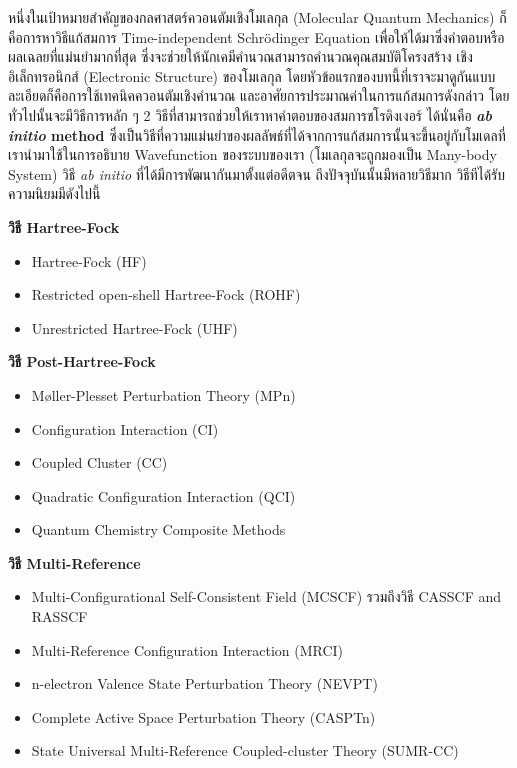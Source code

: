 หนึ่งในเป้าหมายสำคัญของกลศาสตร์ควอนตัมเชิงโมเลกุล (Molecular Quantum Mechanics) ก็คือการหาวิธีแก้สมการ Time-independent
Schr\"{o}dinger Equation เพื่อให้ได้มาซึ่งคำตอบหรือผลเฉลยที่แม่นยำมากที่สุด ซึ่งจะช่วยให้นักเคมีคำนวณสามารถคำนวณคุณสมบัติโครงสร้าง%
เชิงอิเล็กทรอนิกส์ (Electronic Structure) ของโมเลกุล โดยหัวข้อแรกของบทนี้ที่เราจะมาดูกันแบบละเอียดก็คือการใช้เทคนิคควอนตัมเชิงคำนวณ%
และอาศัยการประมาณค่าในการแก้สมการดังกล่าว โดยทั่วไปนั้นจะมีวิธีการหลัก ๆ 2 วิธีที่สามารถช่วยให้เราหาคำตอบของสมการชโรดิงเงอร์ ได้นั่นคือ
\textbf{\textit{ab initio} method} ซึ่งเป็นวิธีที่ความแม่นยำของผลลัพธ์ที่ได้จากการแก้สมการนั้นจะขึ้นอยู่กับโมเดลที่เรานำมาใช้ในการอธิบาย
Wavefunction ของระบบของเรา (โมเลกุลจะถูกมองเป็น Many-body System) วิธี \textit{ab initio} ที่ได้มีการพัฒนากันมาตั้งแต่อดีตจน%
ถึงปัจจุบันนั้นมีหลายวิธีมาก\autocite{friesner2005,helgaker2014,jensen2017} วิธีทีได้รับความนิยมมีดังไปนี้

\noindent \textbf{วิธี Hartree-Fock}
\begin{itemize}[topsep=0pt,noitemsep]
    \item Hartree-Fock (HF)
    \item Restricted open-shell Hartree-Fock (ROHF)
    \item Unrestricted Hartree-Fock (UHF)
\end{itemize}

\noindent \textbf{วิธี Post-Hartree-Fock}
\begin{itemize}[topsep=0pt,noitemsep]
    \item Møller-Plesset Perturbation Theory (MPn)
    \item Configuration Interaction (CI)
    \item Coupled Cluster (CC)
    \item Quadratic Configuration Interaction (QCI)
    \item Quantum Chemistry Composite Methods
\end{itemize}

\noindent \textbf{วิธี Multi-Reference}
\begin{itemize}[topsep=0pt,noitemsep]
    \item Multi-Configurational Self-Consistent Field (MCSCF) รวมถึงวิธี CASSCF and RASSCF
    \item Multi-Reference Configuration Interaction (MRCI)
    \item n-electron Valence State Perturbation Theory (NEVPT)
    \item Complete Active Space Perturbation Theory (CASPTn)
    \item State Universal Multi-Reference Coupled-cluster Theory (SUMR-CC)
\end{itemize}

